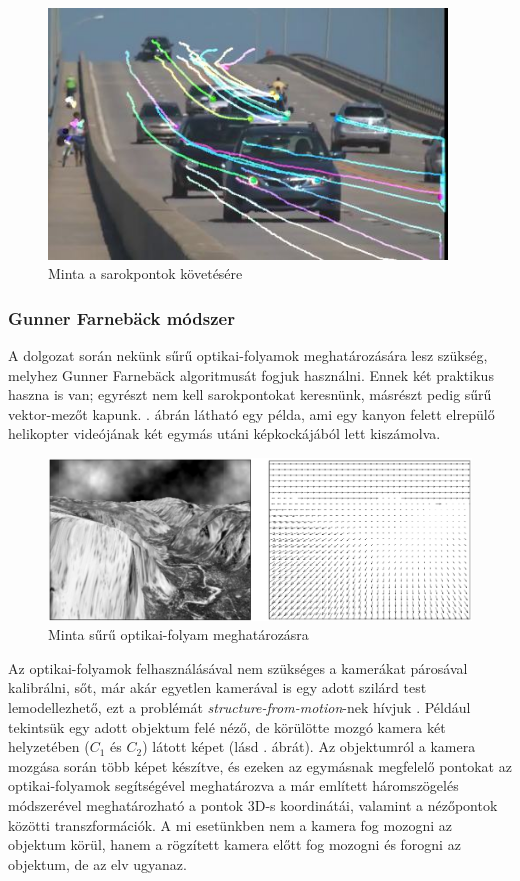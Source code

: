 \begin{figure}[tbh]
\centering
\includegraphics[width=300pt]{figures/opticalflow_lk.jpg}
\caption{Minta a sarokpontok követésére \cite{opencv-lk} \label{fig:lk}}
\end{figure}

\subsubsection{Gunner Farnebäck módszer}

A dolgozat során nekünk sűrű optikai-folyamok meghatározására lesz szükség, melyhez Gunner Farnebäck \cite{farneback} algoritmusát fogjuk használni. Ennek két praktikus haszna is van; egyrészt nem kell sarokpontokat keresnünk, másrészt pedig sűrű vektor-mezőt kapunk. . ábrán látható egy példa, ami egy kanyon felett elrepülő helikopter videójának két egymás utáni képkockájából lett kiszámolva.

\begin{figure}[tbh]
\centering
\includegraphics[width=420pt]{figures/farneback.png}
\caption{Minta sűrű optikai-folyam meghatározásra \cite{farneback} \label{fig:dense-of}}
\end{figure}

Az optikai-folyamok felhasználásával nem szükséges a kamerákat párosával kalibrálni, sőt, már akár egyetlen kamerával is egy adott szilárd test lemodellezhető, ezt a problémát \textit{structure-from-motion}-nek hívjuk \cite{sfm}. Például tekintsük egy adott objektum felé néző, de körülötte mozgó kamera két helyzetében ($C_1$ és $C_2$) látott képet (lásd . ábrát). Az objektumról a kamera mozgása során több képet készítve, és ezeken az egymásnak megfelelő pontokat az optikai-folyamok segítségével meghatározva a már említett háromszögelés módszerével meghatározható a pontok 3D-s koordinátái, valamint a nézőpontok közötti transzformációk. A mi esetünkben nem a kamera fog mozogni az objektum körül, hanem a rögzített kamera előtt fog mozogni és forogni az objektum, de az elv ugyanaz.

